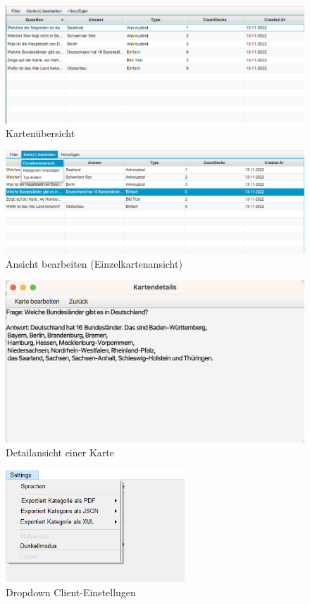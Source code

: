\documentclass[fontsize=12pt,paper=a4,twoside]{scrartcl}
\begin{document}
\begin{figure}
	\caption{Kartenübersicht}
	\label{fig:card_overview}
	\includegraphics[width=\textwidth]{overview-details1.png}
\end{figure}
\begin{figure}
	\caption{Ansicht bearbeiten (Einzelkartenansicht)}
	\label{fig:edit_view}
	\includegraphics[width=\textwidth]{overview-details2.png}
\end{figure}
\begin{figure}
	\caption{Detailansicht einer Karte}
	\label{fig:detail_view}
	\includegraphics[width=\textwidth]{overview-details3.png}
\end{figure}

\begin{figure}
	\centering
	\caption{Dropdown Client-Einstellugen}
	\label{fig:settings}
	\includegraphics[width=0.6\textwidth]{settings.png}
\end{figure}
\end{document}
